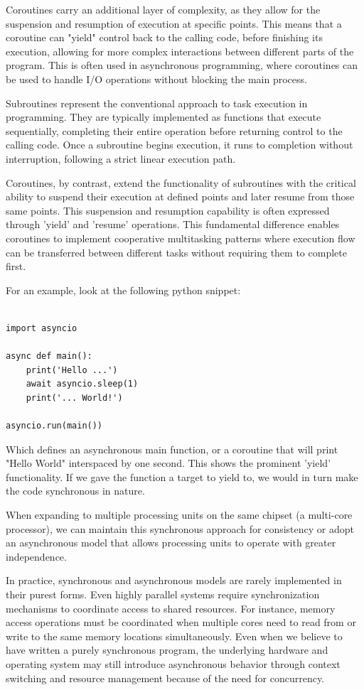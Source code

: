 \documentclass[12pt,a4paper]{article}
\begin{document}
Coroutines carry an additional layer of complexity, as they allow for the suspension and resumption of execution at specific points. This means that a coroutine can "yield" control back to the calling code, before finishing its execution, allowing for more complex interactions between different parts of the program. This is often used in asynchronous programming, where coroutines can be used to handle I/O operations without blocking the main process. 

Subroutines represent the conventional approach to task execution in programming. They are typically implemented as functions that execute sequentially, completing their entire operation before returning control to the calling code. Once a subroutine begins execution, it runs to completion without interruption, following a strict linear execution path.

Coroutines, by contrast, extend the functionality of subroutines with the critical ability to suspend their execution at defined points and later resume from those same points. This suspension and resumption capability is often expressed through 'yield' and 'resume' operations. This fundamental difference enables coroutines to implement cooperative multitasking patterns where execution flow can be transferred between different tasks without requiring them to complete first.

For an example, look at the following python snippet:
\begin{verbatim}

import asyncio

async def main():
    print('Hello ...')
    await asyncio.sleep(1)
    print('... World!')

asyncio.run(main())
\end{verbatim}

Which defines an asynchronous main function, or a coroutine that will print "Hello World" interspaced by one second. This shows the prominent 'yield' functionality. If we gave the function a target to yield to, we would in turn make the code synchronous in nature.

When expanding to multiple processing units on the same chipset (a multi-core processor), we can maintain this synchronous approach for consistency or adopt an asynchronous model that allows processing units to operate with greater independence. 

In practice, synchronous and asynchronous models are rarely implemented in their purest forms. Even highly parallel systems require synchronization mechanisms to coordinate access to shared resources. For instance, memory access operations must be coordinated when multiple cores need to read from or write to the same memory locations simultaneously. Even when we believe to have written a purely synchronous program, the underlying hardware and operating system may still introduce asynchronous behavior through context switching and resource management because of the need for concurrency.
\end{document}
